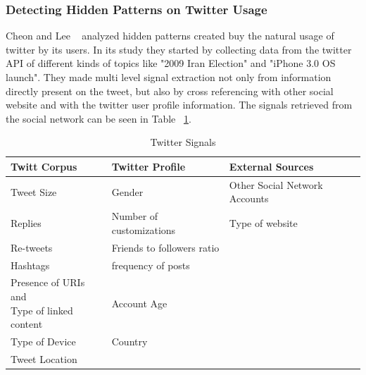 

\subsubsection{Detecting Hidden Patterns on Twitter Usage} %
\label{ssub:detecting_hidden_patterns_on_twitter_usage}

Cheon and Lee ~\citep{Cheong2010} analyzed hidden patterns created buy the natural usage of twitter by its users. In its study they started by collecting data from the twitter API of different kinds of topics like "2009 Iran Election" and "iPhone 3.0 OS launch". They made multi level signal extraction not only from information directly present on the tweet, but also by cross referencing with other social website and with the twitter user profile information. The signals retrieved from the social network can be seen in Table ~\ref{tab:twitter_signals}.

\begin{table}[H]
  \caption{Twitter Signals}
  \label{tab:twitter_signals}
  \begin{center}
    \begin{tabular}{|l|l|l|}
    \hline

    \hline
    \textbf{Twitt Corpus} & \textbf{Twitter Profile} & \textbf{External Sources} \\
    \hline
       Tweet Size & Gender & Other Social Network Accounts\\
    \hline
       Replies & Number of customizations & Type of website\\
    \hline
       Re-tweets & Friends to followers ratio & \\
    \hline
       Hashtags & frequency of posts & \\
    \hline
      \specialcell{Presence of URIs and \\ Type of linked content}
        & Account Age
        & \\
    \hline
       Type of Device & Country & \\
    \hline
       Tweet Location &  & \\
    \hline
    \end{tabular}
  \end{center}
\end{table}

